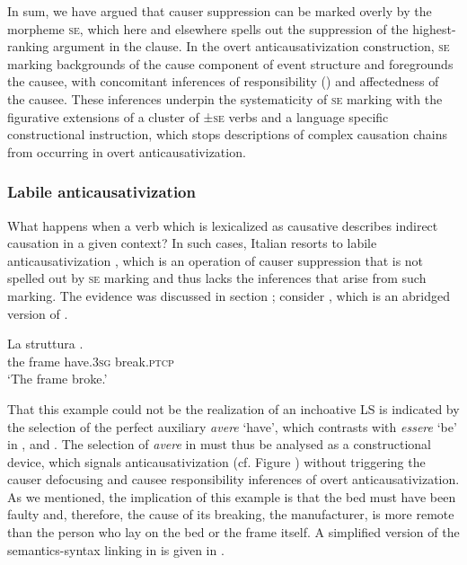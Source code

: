 \documentclass[output=paper,colorlinks,citecolor=brown
]{langscibook}
\begin{document}
In sum, we have argued that causer suppression can be marked overly by the morpheme \textsc{se}, which here and elsewhere spells out the suppression of the highest-ranking argument in the clause. In the overt anticausativization construction, \textsc{se} marking backgrounds of the cause component of event structure and foregrounds the causee, with concomitant inferences of responsibility (\cites[24 and references therein]{zribi1987reflexivite}{kailuweit2012construcciones}{martin2014anticausatives}) and affectedness \citep{lyons1969introduction} of the causee. These inferences underpin the systematicity of \textsc{se} marking with the figurative extensions of a cluster of ±\textsc{se} verbs and a language specific constructional instruction, which stops descriptions of complex causation chains from occurring in overt anticausativization. 

\subsubsection{Labile anticausativization}
\label{bentley_section_5.4.2}
What happens when a verb which is lexicalized as causative describes indirect causation in a given
context? In such cases, Italian resorts to labile anticausativization \citep{bentley2021two}, which
is an operation of causer suppression that is not spelled out by \textsc{se} marking and thus lacks
the inferences that arise from such marking. The evidence was discussed in section ; consider , which is an abridged version of . 

\ea \label{bentley_example_59}
\gll La		struttura							. \\
			the		frame				have.3\textsc{sg}	break.\textsc{ptcp}	\\
\glt 			‘The frame broke.’
\z

That this example could not be the realization of an inchoative LS is indicated by the selection of the perfect auxiliary \textit{avere} ‘have’, which contrasts with \textit{essere} ‘be’ in ,  and . The selection of \textit{avere} in  must thus be analysed as a constructional device, which signals anticausativization (cf. Figure ) without triggering the causer defocusing and causee responsibility inferences of overt anticausativization. As we mentioned, the implication of this example is that the bed must have been faulty and, therefore, the cause of its breaking, the manufacturer, is more remote than the person who lay on the bed or the frame itself. A simplified version of the semantics-syntax linking in  is given in .
\end{document}
